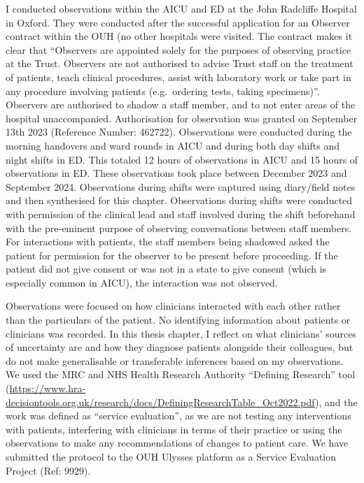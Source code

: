 \documentclass[a4paper, nobind]{templates/ociamthesis}
\begin{document}
\hfill\break
I conducted observations within the AICU and ED at the John Radcliffe Hospital in Oxford. They were conducted after the successful application for an Observer contract within the OUH (no other hospitals were visited. The contract makes it clear that ``Observers are appointed solely for the purposes of observing practice at the Trust. Observers are not authorised to advise Trust staff on the treatment of patients, teach clinical procedures, assist with laboratory work or take part in any procedure involving patients (e.g.~ordering tests, taking specimens)''. Observers are authorised to shadow a staff member, and to not enter areas of the hospital unaccompanied. Authorisation for observation was granted on September 13th 2023 (Reference Number: 462722). Observations were conducted during the morning handovers and ward rounds in AICU and during both day shifts and night shifts in ED. This totaled 12 hours of observations in AICU and 15 hours of observations in ED. These observations took place between December 2023 and September 2024. Observations during shifts were captured using diary/field notes and then synthesised for this chapter. Observations during shifts were conducted with permission of the clinical lead and staff involved during the shift beforehand with the pre-eminent purpose of observing conversations between staff members. For interactions with patients, the staff members being shadowed asked the patient for permission for the observer to be present before proceeding. If the patient did not give consent or was not in a state to give consent (which is especially common in AICU), the interaction was not observed.

\hfill\break
Observations were focused on how clinicians interacted with each other rather than the particulars of the patient. No identifying information about patients or clinicians was recorded. In this thesis chapter, I reflect on what clinicians' sources of uncertainty are and how they diagnose patients alongside their colleagues, but do not make generalisable or transferable inferences based on my observations. We used the MRC and NHS Health Research Authority ``Defining Research'' tool (\url{https://www.hra-decisiontools.org.uk/research/docs/DefiningResearchTable_Oct2022.pdf}), and the work was defined as ``service evaluation'', as we are not testing any interventions with patients, interfering with clinicians in terms of their practice or using the observations to make any recommendations of changes to patient care. We have submitted the protocol to the OUH Ulysses platform as a Service Evaluation Project (Ref: 9929).
\end{document}
